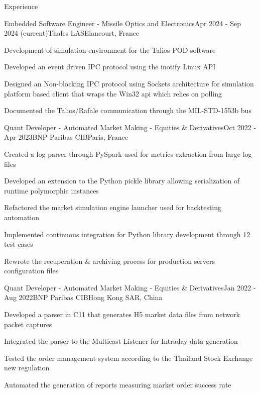 \documentclass[
	a4paper, %
	10pt, %
]{resume} %
\def\CC{{C\nolinebreak[4]\hspace{-.05em}\raisebox{.4ex}{\tiny\bf ++}}}
\begin{document}
\begin{rSection}{Experience}

	\begin{rSubsection}{Embedded Software Engineer - Missile Optics and Electronics}{Apr 2024 - Sep 2024 (current)}{Thales LAS}{Elancourt, France}
		\item Development of simulation environment for the Talios POD software
    \item Developed an event driven IPC protocol using the inotify Linux API
    \item Designed an Non-blocking IPC protocol using Sockets architecture for simulation platform based client that wraps the Win32 api which relies on polling
    \item Documented the Talios/Rafale communication through the MIL-STD-1553b bus
	\end{rSubsection}

	\begin{rSubsection}{Quant Developer - Automated Market Making - Equities \& Derivatives}{Oct 2022 - Apr 2023}{BNP Paribas CIB}{Paris, France}
		\item Created a log parser through PySpark used for metrics extraction from large log files
		\item Developed an extension to the Python pickle library allowing serialization of runtime polymorphic instances
		\item Refactored the market simulation engine launcher used for backtesting automation
		\item Implemented continuous integration for Python library development through 12 test cases
		\item Rewrote the recuperation \& archiving process for production servers configuration files
	\end{rSubsection}

	\begin{rSubsection}{Quant Developer - Automated Market Making - Equities \& Derivatives}{Jan 2022 - Aug 2022}{BNP Paribas CIB}{Hong Kong SAR, China}
    \item Developed a parser in \CC11 that generates H5 market data files from network packet captures
		\item Integrated the parser to the Multicast Listener for Intraday data generation
		\item Tested the order management system according to the Thailand Stock Exchange new regulation
		\item Automated the generation of reports measuring market order success rate
	\end{rSubsection}

\end{rSection}
\end{document}
